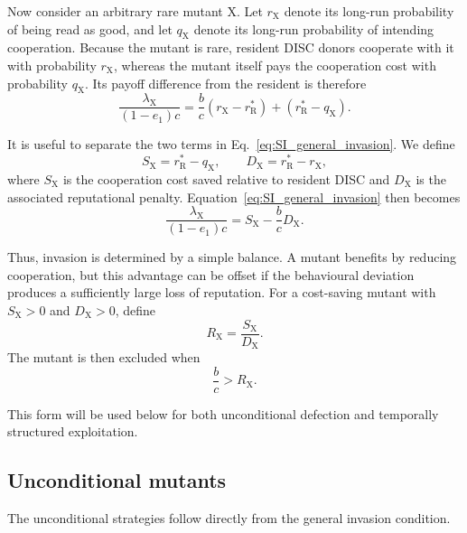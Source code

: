 \documentclass[fleqn,10pt]{wlscirep}
\begin{document}
Now consider an arbitrary rare mutant $\mathrm X$.
Let $r_\mathrm X$ denote its long-run probability of being read as good, and let $q_\mathrm X$ denote its long-run probability of intending cooperation. Because the mutant is rare, resident DISC donors cooperate with it with probability $r_\mathrm X$, whereas the mutant itself pays the cooperation cost with probability $q_\mathrm X$.
Its payoff difference from the resident is therefore
\begin{equation}
\frac{\lambda_\mathrm X}{(1-e_1)c}=\frac{b}{c}(r_\mathrm X-r_\mathrm R^*)+(r_\mathrm R^*-q_\mathrm X).
\label{eq:SI_general_invasion}
\end{equation}

It is useful to separate the two terms in Eq.~\eqref{eq:SI_general_invasion}.
We define
\begin{equation}
S_\mathrm X=r_\mathrm R^*-q_\mathrm X,
\qquad
D_\mathrm X=r_\mathrm R^*-r_\mathrm X,
\label{eq:SI_saved_cost_penalty}
\end{equation}
where $S_\mathrm X$ is the cooperation cost saved relative to resident DISC and $D_\mathrm X$ is the associated reputational penalty.
Equation~\eqref{eq:SI_general_invasion} then becomes
\begin{equation}
\frac{\lambda_\mathrm X}{(1-e_1)c}=S_\mathrm X-\frac{b}{c}D_\mathrm X.
\label{eq:SI_master_invasion}
\end{equation}

Thus, invasion is determined by a simple balance. A mutant benefits by reducing cooperation, but this advantage can be offset if the behavioural deviation produces a sufficiently large loss of reputation. For a cost-saving mutant with $S_\mathrm X>0$ and $D_\mathrm X>0$, define
\begin{equation}
R_\mathrm X=\frac{S_\mathrm X}{D_\mathrm X}.
\label{eq:SI_general_threshold}
\end{equation}
The mutant is then excluded when
\begin{equation}
\frac{b}{c}>R_\mathrm X.
\label{eq:SI_general_lower_condition}
\end{equation}

This form will be used below for both unconditional defection and temporally structured exploitation.

\subsection{Unconditional mutants}

The unconditional strategies follow directly from the general invasion condition.
\end{document}
